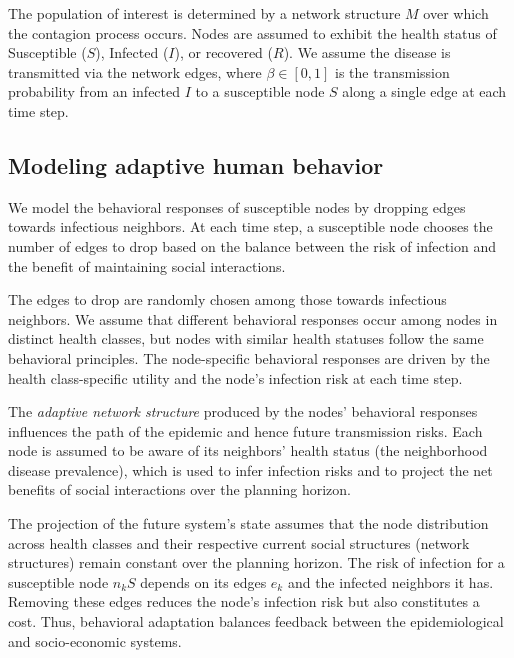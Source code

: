 \documentclass[9pt,twocolumn,twoside]{pnas-new}
\begin{document}
The population of interest is determined by a network structure $M$ over which the contagion process occurs. Nodes are assumed to exhibit the health status of Susceptible ($S$), Infected ($I$), or recovered ($R$). We assume the disease is transmitted via the network edges, where $\beta\in [0,1]$ is the transmission probability from an infected $I$ to a susceptible node $S$ along a single edge at each time step.




\subsection*{Modeling adaptive human behavior}

We model the behavioral responses of susceptible nodes by dropping edges towards infectious neighbors. At each time step, a susceptible node chooses the number of edges to drop based on the balance between the risk of infection and the benefit of maintaining social interactions.

The edges to drop are randomly chosen among those towards infectious neighbors. We assume that different behavioral responses occur among nodes in distinct health classes, but nodes with similar health statuses follow the same behavioral principles. The node-specific behavioral responses are driven by the health class-specific utility and the node's infection risk at each time step.

The {\em adaptive network structure} produced by the nodes' behavioral responses influences the path of the epidemic and hence future transmission risks. Each node is assumed to be aware of its neighbors' health status (the neighborhood disease prevalence), which is used to infer infection risks and to project the net benefits of social interactions over the planning horizon.

The projection of the future system's state assumes that the node distribution across health classes and their respective current social structures (network structures) remain constant over the planning horizon. The risk of infection for a susceptible node $n_kS$ depends on its edges $e_k$ and the infected neighbors it has. Removing these edges reduces the node's infection risk but also constitutes a cost. Thus, behavioral adaptation balances feedback between the epidemiological and socio-economic systems.
\end{document}

